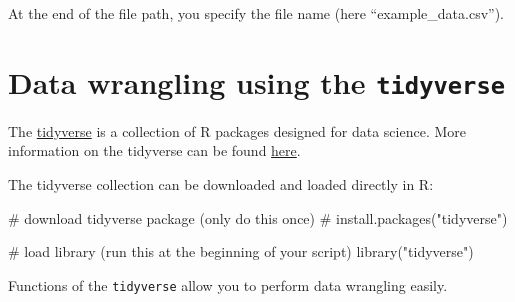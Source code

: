 \documentclass[
  letterpaper,
  DIV=11,
  numbers=noendperiod,
  oneside]{scrreprt}
\newenvironment{Shaded}{\begin{snugshade}}{\end{snugshade}}
\newcommand{\CommentTok}[1]{\textcolor[rgb]{0.37,0.37,0.37}{#1}}
\newcommand{\FunctionTok}[1]{\textcolor[rgb]{0.28,0.35,0.67}{#1}}
\newcommand{\NormalTok}[1]{\textcolor[rgb]{0.00,0.23,0.31}{#1}}
\newcommand{\StringTok}[1]{\textcolor[rgb]{0.13,0.47,0.30}{#1}}
\begin{document}
At the end of the file path, you specify the file name (here
``example\_data.csv'').


\hypertarget{data-wrangling-using-the-tidyverse}{%
\chapter{\texorpdfstring{Data wrangling using the
\texttt{tidyverse}}{Data wrangling using the tidyverse}}\label{data-wrangling-using-the-tidyverse}}

\hfill\break

The \href{https://www.tidyverse.org/}{tidyverse} is a collection of R
packages designed for data science. More information on the tidyverse
can be found \href{https://r4ds.had.co.nz/}{here}.

The tidyverse collection can be downloaded and loaded directly in R:

\begin{Shaded}
\begin{Highlighting}[]
\CommentTok{\# download tidyverse package (only do this once)}
\CommentTok{\# install.packages("tidyverse") }

\CommentTok{\# load library (run this at the beginning of your script)}
\FunctionTok{library}\NormalTok{(}\StringTok{"tidyverse"}\NormalTok{) }
\end{Highlighting}
\end{Shaded}

Functions of the \texttt{tidyverse} allow you to perform data wrangling
easily.
\end{document}
